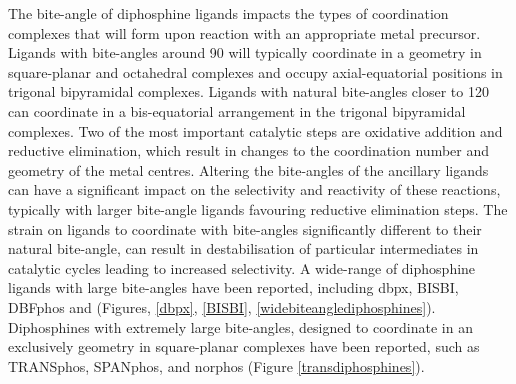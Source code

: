 The bite-angle of diphosphine ligands impacts the types of coordination complexes that will form upon reaction with an appropriate metal precursor.  Ligands with bite-angles around 90\degrees{} will typically coordinate in a \cis{} geometry in square-planar and octahedral complexes and occupy axial-equatorial positions in trigonal bipyramidal complexes.  Ligands with natural bite-angles closer to 120\degrees{} can coordinate in a bis-equatorial arrangement in the trigonal bipyramidal complexes.\cite{Kranenburg1995}  Two of the most important catalytic steps are oxidative addition and reductive elimination, which result in changes to the coordination number and geometry of the metal centres.\cite{Tsuji1995}  Altering the bite-angles of the ancillary ligands can have a significant impact on the selectivity and reactivity of these reactions, typically with larger bite-angle ligands favouring reductive elimination steps.\cite{Freixa2003}  The strain on ligands to coordinate with bite-angles significantly different to their natural bite-angle, can result in destabilisation of particular intermediates in catalytic cycles leading to increased selectivity.\cite{Freixa2003}  A wide-range of diphosphine ligands with large bite-angles have been reported, including dbpx, BISBI, DBFphos and \Phxantphos{} (Figures, \ref{dbpx}, \ref{BISBI}, \ref{widebiteanglediphosphines}).  Diphosphines with extremely large bite-angles, designed to coordinate in an exclusively \trans{} geometry in square-planar complexes have been reported, such as TRANSphos, SPANphos, and norphos (Figure \ref{transdiphosphines})\cite{Freixa2003b, Kamer2001, Dierkes1999}.

